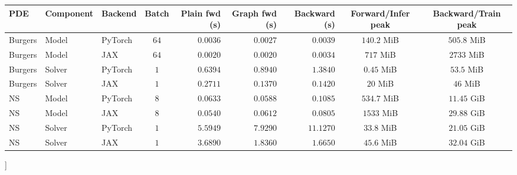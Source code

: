 \documentclass[letterpaper]{article} %
\begin{document}
\begin{center}
\footnotesize
{}
\label{tab:standalone_component_timing_memory}
\setlength{\tabcolsep}{2.1pt}
\begin{tabular}{lllcrrrcc}
\toprule
PDE & Component & Backend & Batch & Plain fwd (s) & Graph fwd (s) & Backward (s) & Forward/Infer peak & Backward/Train peak \\
\midrule
Burgers & Model & PyTorch & $64$ & $0.0036$ & $0.0027$ & $0.0039$ & $140.2$ MiB & $505.8$ MiB \\
Burgers & Model & JAX & $64$ & $0.0020$ & $0.0020$ & $0.0034$ & $717$ MiB & $2733$ MiB \\
Burgers & Solver & PyTorch & $1$ & $0.6394$ & $0.8940$ & $1.3840$ & $0.45$ MiB & $53.5$ MiB \\
Burgers & Solver & JAX & $1$ & $0.2711$ & $0.1370$ & $0.1420$ & $20$ MiB & $46$ MiB \\
NS & Model & PyTorch & $8$ & $0.0633$ & $0.0588$ & $0.1085$ & $534.7$ MiB & $11.45$ GiB \\
NS & Model & JAX & $8$ & $0.0540$ & $0.0612$ & $0.0805$ & $1533$ MiB & $29.88$ GiB \\
NS & Solver & PyTorch & $1$ & $5.5949$ & $7.9290$ & $11.1270$ & $33.8$ MiB & $21.05$ GiB \\
NS & Solver & JAX & $1$ & $3.6890$ & $1.8360$ & $1.6650$ & $45.6$ MiB & $32.04$ GiB \\
\bottomrule
\end{tabular}
\end{center}
\vspace{0.2em}
]
\end{document}
